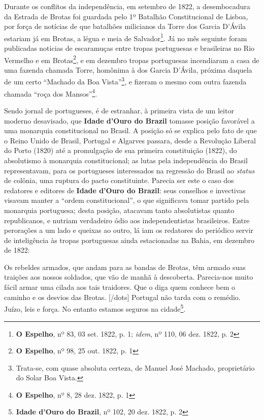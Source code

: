 Durante os conflitos da independência, em setembro de 1822, a desembocadura da Estrada de Brotas foi guardada pelo 1º Batalhão Constitucional de Lisboa, por força de notícias de que batalhões milicianos da Torre dos Garcia D'Ávila estariam já em Brotas, a légua e meia de Salvador\footnote{\textbf{O Espelho}, nº 83, 03 set. 1822, p. 1; \textit{idem}, nº 110, 06 dez. 1822, p. 2}. Já no mês seguinte foram publicadas noticias de escaramuças entre tropas portuguesas e brasileiras no Rio Vermelho e em Brotas\footnote{\textbf{O Espelho}, nº 98, 25 out. 1822, p. 1}, e em dezembro tropas portuguesas incendiaram a casa de uma fazenda chamada Torre, homônima à dos Garcia D'Ávila, próxima daquela de um certo ``Machado da Boa Vista''\footnote{Trata-se, com quase absoluta certeza, de Manuel José Machado, proprietário do Solar Boa Vista.}, e fizeram o mesmo com outra fazenda chamada ``roça dos Mansos''\footnote{\textbf{O Espelho}, nº 8, 28 dez. 1822, p. 1}.

Sendo jornal de portugueses, é de estranhar, à primeira vista de um leitor moderno desavisado, que \textbf{Idade d'Ouro do Brazil} tomasse posição favorável a uma monarquia constitucional no Brasil. A posição só se explica pelo fato de que o Reino Unido de Brasil, Portugal e Algarves passara, desde a Revolução Liberal do Porto (1820) até a promulgação de sua primeira constituição (1822), do absolutismo à monarquia constitucional; as lutas pela independência do Brasil representavam, para os portugueses interessados na regressão do Brasil ao \textit{status} de colônia, uma ruptura do pacto constituinte. Parecia ser este o caso dos redatores e editores de \textbf{Idade d'Ouro do Brazil}: seus conselhos e invectivas visavam manter a ``ordem constitucional'', o que significava tomar partido pela monarquia portuguesa; desta posição, atacavam tanto absolutistas quanto republicanos, e nutriam verdadeiro ódio aos independentistas brasileiros. Entre perorações a um lado e queixas ao outro, lá iam os redatores do periódico servir de inteligência às tropas portuguesas ainda estacionadas na Bahia, em dezembro de 1822:

\begin{citacao}
Os rebeldes armados, que andam para as bandas de Brotas, têm armado suas traições aos nossos soldados, que vão de manhã à descoberta. Parecia-nos muito fácil armar uma cilada aos tais traidores. Que o diga quem conhece bem o caminho e os desvios das Brotas. [/dots] Portugal não tarda com o remédio. Juízo, leis e força. No entanto estamos seguros na cidade\footnote{\textbf{Idade d'Ouro do Brazil}, nº 102, 20 dez. 1822, p. 2}.
\end{citacao}

